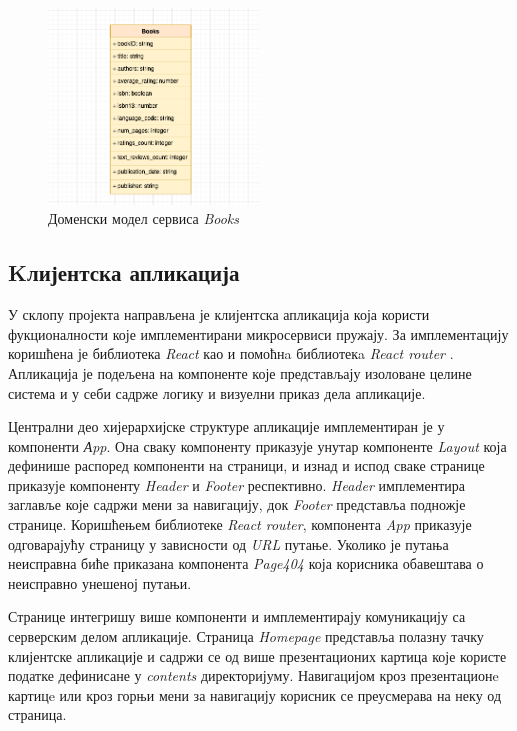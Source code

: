 \documentclass[12pt,oneside]{memoir}
\begin{document}
\begin{figure}[!ht]
  \centering
  \includegraphics[width=0.5\textwidth]{matfmaster/img/booksShema.png}
  \caption{Доменски модел сервиса \textit{Books}}
  \label{fig:booksShema}
\end{figure}
\newpage

\newpage


\subsection{Kлијентска апликација}

У склопу пројекта направљена је клијентска апликација која користи фукционалности које имплементирани микросервиси пружају. За имплементацију коришћена је библиотека \textit{React} као и помоћнa библиотекa \textit{React router} \cite{reactRouter}. Апликација је подељена на компоненте које представљају изоловане целине система и у себи садрже логику и визуелни приказ дела апликације.

Централни део хијерархијске структуре апликације имплементиран је у компоненти \textit{Аpp}. Она сваку компоненту приказује унутар компоненте \textit{Layout} која дефинише распоред компоненти на страници, и изнад и испод сваке странице приказује компоненту \textit{Header} и \textit{Footer} респективно. \textit{Header} имплементира заглавље које садржи мени за навигацију, док \textit{Footer} представља подножје странице. Коришћењем библиотеке \textit{React router}, компонента \textit{App} приказује одговарајућу страницу у зависности од \textit{URL} путање. Уколико је путања неисправна биће приказана компонента \textit{Page404} која корисника обавештава о неисправно унешеној путањи.  

Странице интегришу више компоненти и имплементирају комуникацију са серверским делом апликације. Страница \textit{Homepage} представља полазну тачку клијентске апликације и садржи се од више презентационих картица које користе податке дефинисане у \textit{contents} директоријуму. Навигацијом кроз презентационe картицe или кроз горњи мени за навигацију корисник се преусмерава на неку од страница. 
\end{document}
